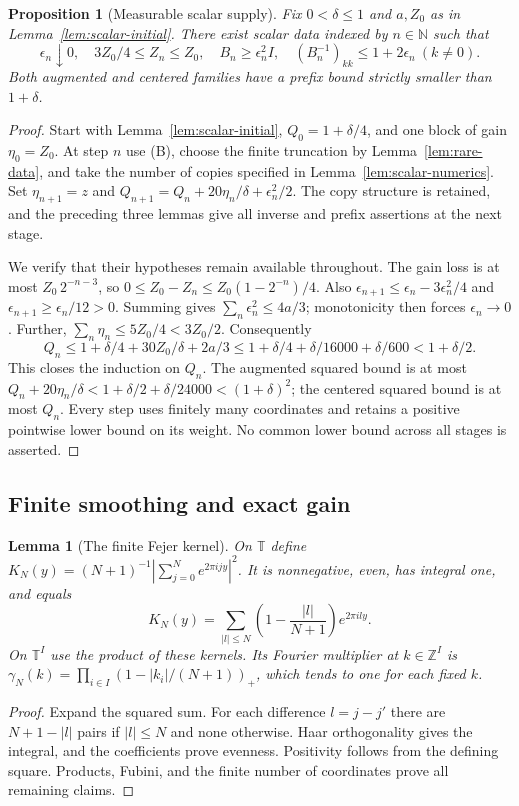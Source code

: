\documentclass[reqno,a4paper,12pt]{amsart}
\newtheorem{proposition}[theorem]{Proposition}
\newtheorem{lemma}[theorem]{Lemma}
\theoremstyle{definition}
\newcommand{\Z}{\mathbb Z}
\newcommand{\N}{\mathbb N}
\newcommand{\T}{\mathbb T}
\begin{document}
\begin{proposition}[Measurable scalar supply]\label{prop:raw-scalar}
Fix $0<\delta\le1$ and $a,Z_0$ as in
Lemma~\ref{lem:scalar-initial}. There exist scalar data indexed by
$n\in\N$ such that
\[
 \epsilon_n\downarrow0,\quad 3Z_0/4\le Z_n\le Z_0,\quad
 B_n\ge\epsilon_n^2I,\quad
 (B_n^{-1})_{kk}\le1+2\epsilon_n\ (k\ne0).
\]
Both augmented and centered families have a prefix bound strictly
smaller than $1+\delta$.
\end{proposition}
\begin{proof}
Start with Lemma~\ref{lem:scalar-initial}, $Q_0=1+\delta/4$,
and one block of gain $\eta_0=Z_0$. At step $n$ use (B), choose
the finite truncation by Lemma~\ref{lem:rare-data}, and take the
number of copies specified in Lemma~\ref{lem:scalar-numerics}.
Set $\eta_{n+1}=z$ and
$Q_{n+1}=Q_n+20\eta_n/\delta+\epsilon_n^2/2$.
The copy structure is retained, and the preceding three lemmas give
all inverse and prefix assertions at the next stage.

We verify that their hypotheses remain available throughout.
The gain loss is at most $Z_0\,2^{-n-3}$, so
$0\le Z_0-Z_n\le Z_0(1-2^{-n})/4$.
Also $\epsilon_{n+1}\le\epsilon_n-3\epsilon_n^2/4$ and
$\epsilon_{n+1}\ge\epsilon_n/12>0$.
Summing gives $\sum_n\epsilon_n^2\le4a/3$; monotonicity then forces
$\epsilon_n\to0$. Further,
$\sum_n\eta_n\le5Z_0/4<3Z_0/2$.
Consequently
\[
 Q_n\le1+\delta/4+30Z_0/\delta+2a/3
 \le1+\delta/4+\delta/16000+\delta/600<1+\delta/2.
\]
This closes the induction on $Q_n$.
The augmented squared bound is at most
$Q_n+20\eta_n/\delta<1+\delta/2+\delta/24000<(1+\delta)^2$;
the centered squared bound is at most $Q_n$.
Every step uses finitely many coordinates and retains a positive
pointwise lower bound on its weight. No common lower bound across
all stages is asserted.
\end{proof}

\subsection{Finite smoothing and exact gain}
\begin{lemma}[The finite Fejer kernel]\label{lem:fejer}
On $\T$ define
$K_N(y)=(N+1)^{-1}|\sum_{j=0}^N e^{2\pi ijy}|^2$.
It is nonnegative, even, has integral one, and equals
\[
 K_N(y)=\sum_{|l|\le N}\left(1-\frac{|l|}{N+1}\right)e^{2\pi ily}.
\]
On $\T^I$ use the product of these kernels. Its Fourier multiplier
at $k\in\Z^I$ is
$\gamma_N(k)=\prod_{i\in I}(1-|k_i|/(N+1))_+$,
which tends to one for each fixed $k$.
\end{lemma}
\begin{proof}
Expand the squared sum. For each difference $l=j-j'$ there are
$N+1-|l|$ pairs if $|l|\le N$ and none otherwise.
Haar orthogonality gives the integral, and the coefficients prove
evenness. Positivity follows from the defining square. Products,
Fubini, and the finite number of coordinates prove all remaining claims.
\end{proof}
\end{document}

